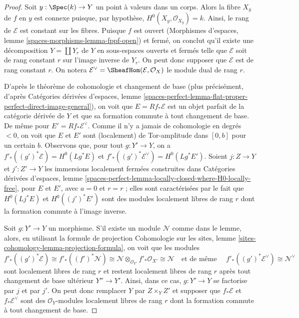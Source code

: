 \begin{proof}
Soit $y : \Spec(k) \to Y$ un point à valeurs dans un corps.
Alors la fibre $X_y$ de $f$ en $y$ est connexe puisque, par hypothèse,
$H^0(X_y, \mathcal{O}_{X_y}) = k$. Ainsi, le rang de
$\mathcal{E}$ est constant sur les fibres. Puisque $f$ est ouvert
(Morphismes d'espaces, lemme \ref{spaces-morphisms-lemma-fppf-open})
et fermé, on conclut qu'il existe une décomposition $Y = \coprod Y_r$
de $Y$ en sous-espaces ouverts et fermés telle que $\mathcal{E}$
soit de rang constant $r$ sur l'image inverse de $Y_r$.
On peut donc supposer que $\mathcal{E}$ est de rang constant $r$.
On notera $\mathcal{E}^\vee = \SheafHom(\mathcal{E}, \mathcal{O}_X)$
le module dual de rang $r$.

\medskip\noindent
D'après le théorème de cohomologie et changement de base (plus précisément, d'après
Catégories dérivées d'espaces, lemme
\ref{spaces-perfect-lemma-flat-proper-perfect-direct-image-general}),
on voit que $E = Rf_*\mathcal{E}$ est un objet parfait de la
catégorie dérivée de $Y$ et que sa formation commute à
tout changement de base. De même pour $E' = Rf_*\mathcal{E}^\vee$.
Comme il n'y a jamais de cohomologie en degrés $< 0$, on voit que
$E$ et $E'$ sont (localement) de Tor-amplitude dans $[0, b]$ pour un certain $b$.
Observons que, pour tout $g : Y' \to Y$, on a
$f'_*((g')^*\mathcal{E}) = H^0(Lg^*E)$ et
$f'_*((g')^*\mathcal{E}^\vee) = H^0(Lg^*E')$.
Soient $j : Z \to Y$ et $j' : Z' \to Y$ les immersions localement
fermées construites dans Catégories dérivées d'espaces, lemme
\ref{spaces-perfect-lemma-locally-closed-where-H0-locally-free},
pour $E$ et $E'$, avec $a = 0$ et $r = r$ ; elles sont caractérisées
par le fait que $H^0(Lj^*E)$ et $H^0((j')^*E')$
sont des modules localement libres de rang $r$ dont la formation commute à l'image inverse.

\medskip\noindent
Soit $g : Y' \to Y$ un morphisme. S'il existe un module $\mathcal{N}$
comme dans le lemme, alors, en utilisant la formule de projection
Cohomologie sur les sites, lemme \ref{sites-cohomology-lemma-projection-formula},
on voit que les modules
$$
f'_*((g')^*\mathcal{E}) \cong
f'_*((f')^*\mathcal{N}) \cong
\mathcal{N} \otimes_{\mathcal{O}_{Y'}} f'_*\mathcal{O}_{X'} \cong
\mathcal{N}\quad\text{et de même }\quad
f'_*((g')^*\mathcal{E}^\vee) \cong \mathcal{N}^\vee
$$
sont localement libres de rang $r$ et restent localement libres de rang $r$
après tout changement de base ultérieur $Y'' \to Y'$.
Ainsi, dans ce cas, $g : Y' \to Y$ se factorise par $j$ et par $j'$.
On peut donc remplacer $Y$ par $Z \times_Y Z'$ et supposer que
$f_*\mathcal{E}$ et $f_*\mathcal{E}^\vee$ sont des
$\mathcal{O}_Y$-modules localement libres de rang $r$
dont la formation commute à tout changement de base.


\end{proof}
